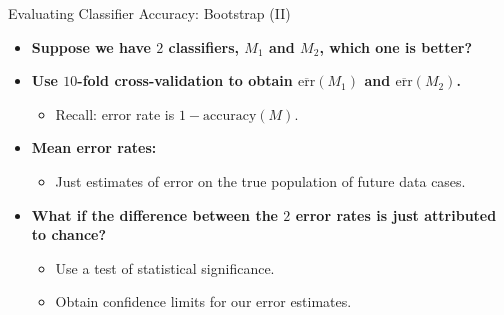 \begin{frame}{Evaluating Classifier Accuracy: Bootstrap (II)}
	\begin{itemize}
		\item \textbf{Suppose we have $2$ classifiers, $M_1$ and $M_2$, which one is better?}
		\item \textbf{Use $10$-fold cross-validation to obtain $\overline{\text{err}}(M_1)$ and $\overline{\text{err}}(M_2)$.}
		      \begin{itemize}
			      \item Recall: error rate is $1-\text{accuracy}(M)$.
		      \end{itemize}
		\item \textbf{Mean error rates:}
		      \begin{itemize}
			      \item Just estimates of error on the true population of future data cases.
		      \end{itemize}
		\item \textbf{What if the difference between the $2$ error rates is just attributed to chance?}
		      \begin{itemize}
			      \item Use a test of statistical significance.
			      \item Obtain confidence limits for our error estimates.
		      \end{itemize}
	\end{itemize}
\end{frame}

